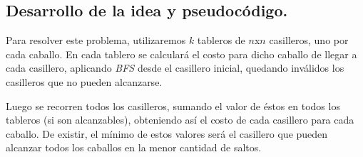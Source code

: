 \newpage
\subsection{Desarrollo de la idea y pseudocódigo.}

\vspace*{0.3cm}


Para resolver este problema, utilizaremos $k$ tableros de $n$x$n$ casilleros,
uno por cada caballo. En cada tablero se calculará el costo para dicho caballo
de llegar a cada casillero, aplicando \textit{BFS} desde el casillero inicial,
quedando inválidos los casilleros que no pueden alcanzarse.

Luego se recorren todos los casilleros, sumando el valor de éstos en todos los
tableros (si son alcanzables), obteniendo así el costo de cada casillero para
cada caballo. De existir, el mínimo de estos valores será el casillero que
pueden alcanzar todos los caballos en la menor cantidad de saltos.

%
% 
%
%
%
%
%

